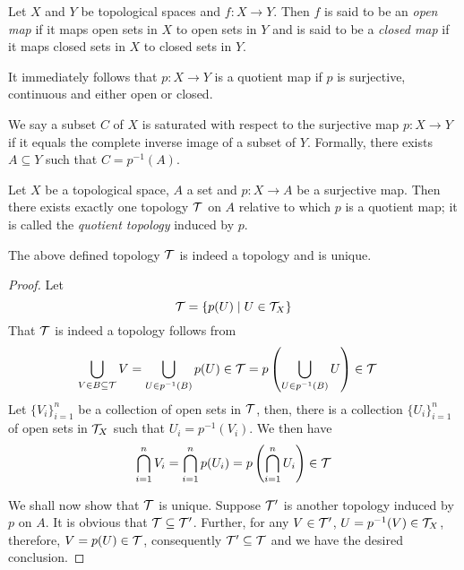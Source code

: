 \begin{definition}
    Let $X$ and $Y$ be topological spaces and $f:X\to Y$. Then $f$ is said to be an \textit{open map} if it maps open sets in $X$ to open sets in $Y$ and is said to be a \textit{closed map} if it maps closed sets in $X$ to closed sets in $Y$.
\end{definition}

It immediately follows that $p:X\to Y$ is a quotient map if $p$ is surjective, continuous and either open or closed.

We say a subset $C$ of $X$ is saturated with respect to the surjective map $p:X\to Y$ if it equals the complete inverse image of a subset of $Y$. Formally, there exists $A\subseteq Y$ such that $C = p^{-1}(A)$.

\begin{definition}
    Let $X$ be a topological space, $A$ a set and $p:X\to A$ be a surjective map. Then there exists exactly one topology $\mathcal{T}$ on $A$ relative to which $p$ is a quotient map; it is called the \textit{quotient topology} induced by $p$.
\end{definition}

\begin{proposition}
    The above defined topology $\mathcal{T}$ is indeed a topology and is unique.
\end{proposition}
\begin{proof}
    Let 
    \begin{equation*}
        \mathcal{T} = \{p(U)\mid U\in\mathcal{T}_X\}
    \end{equation*}
    That $\mathcal{T}$ is indeed a topology follows from 
    \begin{align*}
        \bigcup_{V\in B\subseteq\mathcal{T}}V &= \bigcup_{U\in p^{-1}(B)}p(U)\in\mathcal{T} = p\left(\bigcup_{U\in p^{-1}(B)} U\right)\in\mathcal{T}
    \end{align*}
    Let $\{V_i\}_{i = 1}^n$ be a collection of open sets in $\mathcal{T}$, then, there is a collection $\{U_i\}_{i = 1}^n$ of open sets in $\mathcal{T}_X$ such that $U_i = p^{-1}(V_i)$. We then have 
    \begin{equation*}
        \bigcap_{i = 1}^n V_i = \bigcap_{i = 1}^np(U_i) = p\left(\bigcap_{i = 1}^n U_i\right)\in\mathcal{T}
    \end{equation*}
    
    We shall now show that $\mathcal{T}$ is unique. Suppose $\mathcal{T}'$ is another topology induced by $p$ on $A$. It is obvious that $\mathcal{T}\subseteq\mathcal{T}'$. Further, for any $V\in\mathcal{T}'$, $U = p^{-1}(V)\in\mathcal{T}_X$, therefore, $V = p(U)\in\mathcal{T}$, consequently $\mathcal{T}'\subseteq\mathcal{T}$ and we have the desired conclusion.
\end{proof}

